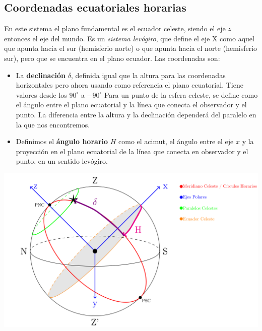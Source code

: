 \subsection{Coordenadas ecuatoriales horarias}

En este sistema el plano fundamental es el ecuador celeste, siendo el eje $z$ entonces el eje del mundo. Es un \textit{sistema levógiro}, que define el eje X como aquel que apunta hacia el sur (hemisferio norte) o que apunta hacia el norte (hemisferio sur), pero que se encuentra en el plano ecuador. Las coordenadas son:

\hspace{-8.0mm} \vspace{1.0mm} \begin{minipage}{0.6\textwidth}
	\begin{itemize}
		\item La \textbf{declinación} $\delta$, definida igual que la altura para las coordenadas horizontales pero ahora usando como referencia el plano ecuatorial.  Tiene valores desde los $90^\circ$ a $-90^\circ$ Para un punto de la esfera celeste, se define como el ángulo entre el plano ecuatorial y la línea que conecta el observador y el punto. La diferencia entre la altura y la declinación dependerá del paralelo en la que nos encontremos.
		\item Definimos el \textbf{ángulo horario} $H$ como el acimut, el ángulo entre el eje $x$ y la proyección en el plano ecuatorial de la línea que conecta en observador y el punto, en un sentido levógiro.
	\end{itemize}
\end{minipage}	\hfill
\begin{minipage}{0.35\textwidth} \centering
	\includegraphics[width=1.1\linewidth]{Cuerpo/Ch_01/Coordenadas_Horarias.png}
	\label{Fig:01-horarias}
\end{minipage}


